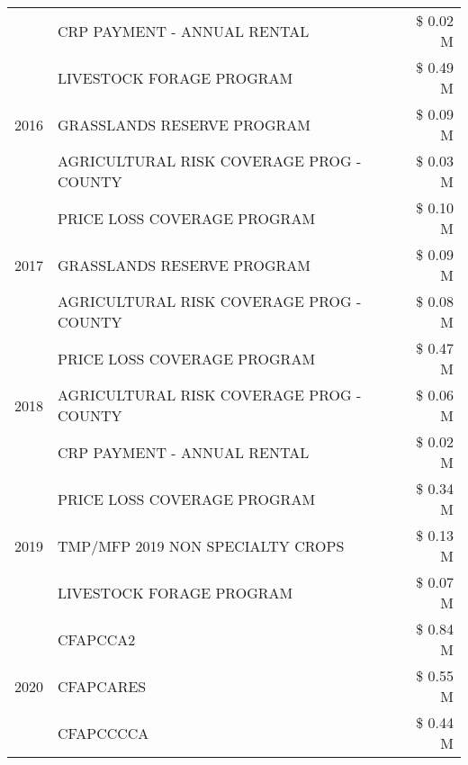 \begin{tabular}{llr}
 & CRP PAYMENT - ANNUAL RENTAL & \$ 0.02 M \\
\cline{1-3}
\multirow[t]{3}{*}{2016} & LIVESTOCK FORAGE PROGRAM                      & \$ 0.49 M \\
 & GRASSLANDS RESERVE PROGRAM                    & \$ 0.09 M \\
 & AGRICULTURAL RISK COVERAGE PROG - COUNTY      & \$ 0.03 M \\
\cline{1-3}
\multirow[t]{3}{*}{2017} & PRICE LOSS COVERAGE PROGRAM & \$ 0.10 M \\
 & GRASSLANDS RESERVE PROGRAM & \$ 0.09 M \\
 & AGRICULTURAL RISK COVERAGE PROG - COUNTY & \$ 0.08 M \\
\cline{1-3}
\multirow[t]{3}{*}{2018} & PRICE LOSS COVERAGE PROGRAM & \$ 0.47 M \\
 & AGRICULTURAL RISK COVERAGE PROG - COUNTY & \$ 0.06 M \\
 & CRP PAYMENT - ANNUAL RENTAL & \$ 0.02 M \\
\cline{1-3}
\multirow[t]{3}{*}{2019} & PRICE LOSS COVERAGE PROGRAM & \$ 0.34 M \\
 & TMP/MFP 2019 NON SPECIALTY CROPS & \$ 0.13 M \\
 & LIVESTOCK FORAGE PROGRAM & \$ 0.07 M \\
\cline{1-3}
\multirow[t]{3}{*}{2020} & CFAPCCA2 & \$ 0.84 M \\
 & CFAPCARES & \$ 0.55 M \\
 & CFAPCCCCA & \$ 0.44 M \\
\cline{1-3}
\bottomrule
\end{tabular}

